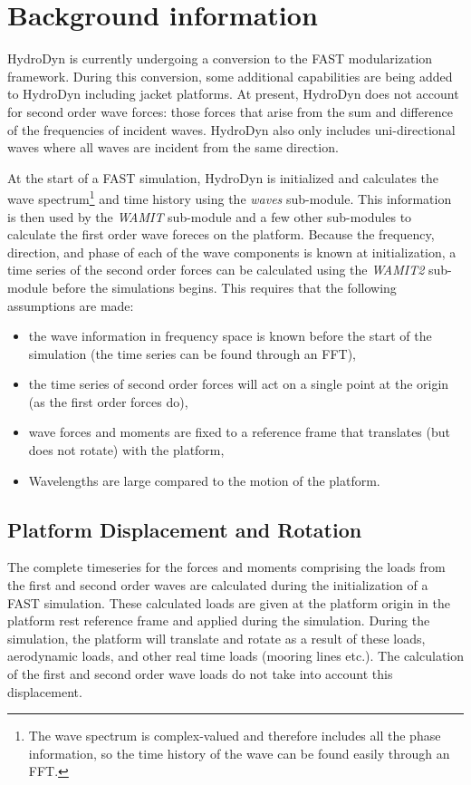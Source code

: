 \chapter{Background information}
\label{chap:Background}
HydroDyn is currently undergoing a conversion to the FAST modularization framework. During this conversion, some additional capabilities are being added to HydroDyn including jacket platforms. At present, HydroDyn does not account for second order wave forces: those forces that arise from the sum and difference of the frequencies of incident waves. HydroDyn also only includes uni-directional waves where all waves are incident from the same direction.

At the start of a FAST simulation, HydroDyn is initialized and calculates the wave spectrum\footnote{
      The wave spectrum is complex-valued and therefore includes all the phase information, so the time history of the wave can be found easily through an FFT.}
and time history using the \emph{waves} sub-module.  This information is then used by the \emph{WAMIT} sub-module and a few other sub-modules to calculate the first order wave foreces on the platform.  Because the frequency, direction, and phase of each of the wave components is known at initialization, a time series of the second order forces can be calculated using the \emph{WAMIT2} sub-module before the simulations begins. This requires that the following assumptions are made:
\begin{itemize}
   \item{the wave information in frequency space is known before the start of the simulation (the time series can be found through an FFT),}
   \item{the time series of second order forces will act on a single point at the origin (as the first order forces do),}
   \item{wave forces and moments are fixed to a reference frame that translates (but does not rotate) with the platform,}
   \item{Wavelengths are large compared to the motion of the platform.}
\end{itemize}

\section{Platform Displacement and Rotation}
The complete timeseries for the forces and moments comprising the loads from the first and second order waves are calculated during the initialization of a FAST simulation.  These calculated loads are given at the platform origin in the platform rest reference frame and applied during the simulation.  During the simulation, the platform will translate and rotate as a result of these loads, aerodynamic loads, and other real time loads (mooring lines etc.).
The calculation of the first and second order wave loads do not take into account this displacement.  

